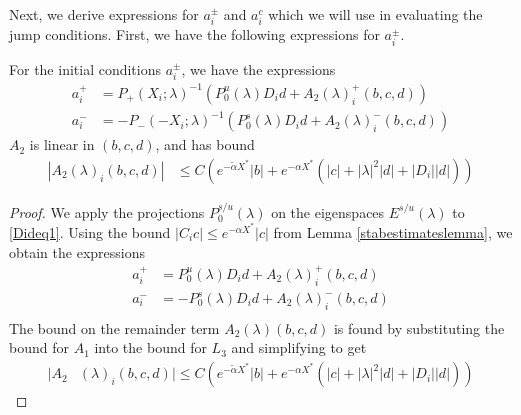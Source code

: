 \documentclass[thesis.tex]{subfiles}
\begin{document}
Next, we derive expressions for $a_i^\pm$ and $a_i^c$ which we will use in evaluating the jump conditions. First, we have the following expressions for $a_i^\pm$.

\begin{lemma}\label{lemma:aipm}
For the initial conditions $a_i^\pm$, we have the expressions
\begin{equation}\label{aipmexp1}
\begin{aligned}
a_i^+ &= P_+(X_i; \lambda)^{-1} \left( P_0^u(\lambda) D_i d + A_2(\lambda)_i^+(b, c, d) \right) \\
a_i^- &= -P_-(-X_i; \lambda)^{-1} \left( P_0^s(\lambda) D_i d + A_2(\lambda)_i^-(b, c, d) \right)
\end{aligned}
\end{equation}
$A_2$ is linear in $(b, c, d)$, and has bound
\begin{align}
|A_2(\lambda)_i(b, c, d)|
&\leq C \left(e^{-\tilde{\alpha} X^*}|b| + e^{-\alpha X^*}(|c| + |\lambda|^2|d| + |D_i||d|) \right) \label{A2bound}
\end{align}

\begin{proof}
We apply the projections $P_0^{s/u}(\lambda)$ on the eigenspaces $E^{s/u}(\lambda)$ to \eqref{Dideq1}. Using the bound $|C_i c| \leq e^{-\alpha X^*}|c|$ from Lemma \ref{stabestimateslemma}, we obtain the expressions
\begin{align*}
a_i^+ &= P_0^u(\lambda) D_i d + A_2(\lambda)_i^+(b, c, d) \\
a_i^- &= -P_0^s(\lambda) D_i d + A_2(\lambda)_i^-(b, c, d) \\
\end{align*}
The bound on the remainder term $A_2(\lambda)(b, c, d)$ is found by substituting the bound for $A_1$ into the bound for $L_3$ and simplifying to get
\begin{align*}
|A_2&(\lambda)_i(b, c, d)| \leq C \left(e^{-\tilde{\alpha} X^*}|b| + e^{-\alpha X^*}(|c| + |\lambda|^2|d| + |D_i||d|) \right)
\end{align*} 


\end{proof}
\end{lemma}
\end{document}
